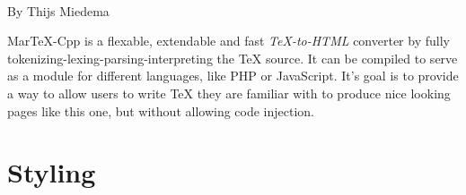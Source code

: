 \begin{page}
%
%
\newcommand\descriptor[2]{
\textbf{#1}
\begin{paragraph}#2\end{paragraph}%
}%
%

\begin{tabular}[lr]  \\ By Thijs Miedema \\ \hline \end{tabular}
		MarTeX-Cpp is a flexable, extendable and fast \textit{TeX-to-HTML} converter by fully tokenizing-lexing-parsing-interpreting the TeX source. It can be compiled to serve as a module for different languages, like PHP or JavaScript. It's goal is to provide a way to allow users to write TeX they are familiar with to produce nice looking pages like this one, but without allowing code injection.
        
\section{Styling}


\end{page}
